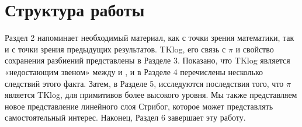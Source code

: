 \section{Структура работы}

Раздел 2 напоминает необходимый материал, как с точки зрения математики, так и с точки зрения предыдущих результатов. TKlog, его связь с \(\pi\) и свойство сохранения разбиений представлены в Разделе 3. Показано, что TKlog является «недостающим звеном» между \cite{BPU16a} и \cite{PU16}, и в Разделе 4 перечислены несколько следствий этого факта. Затем, в Разделе 5, исследуются последствия того, что \(\pi\) является TKlog, для примитивов более высокого уровня. Мы также представляем новое представление линейного слоя Стрибог, которое может представлять самостоятельный интерес. Наконец, Раздел 6 завершает эту работу.

